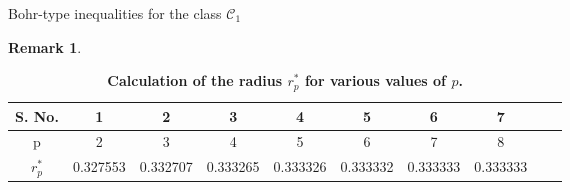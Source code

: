 \documentclass[12pt,a4paper,reqno]{amsart}
\theoremstyle{definition}
\newtheorem{remark}[definition]{Remark}
\theoremstyle{plain}
\numberwithin{equation}{section}
\begin{document}
\begin{section}{Bohr-type inequalities for the class $\mathcal{C}_1$}
\begin{remark}
\end{remark}
\begin{table}[h!]
    \begin{center}
		\begin{tabular}{ |c|c|c|c|c|c|c|c|c|c| }
			\hline
			S. No. & 1 & 2&3&4&5&6&7\\
			\hline
			p & 2 & 3&4&5&6&7&8\\
			\hline
			$r^*_p$ & 0.327553 & 0.332707 & 0.333265 & 0.333326 & 0.333332 & 0.333333 &0.333333\\
			\hline
		\end{tabular}
        \caption{\textbf{Calculation of the  radius $r^*_p$ for various values of $p$.}}
		\label{Table:2}
    \end{center}
\end{table}


\end{section}
\end{document}
